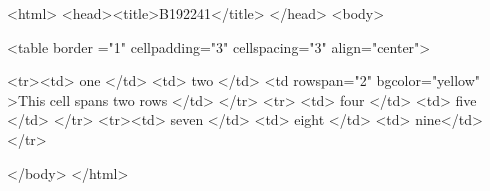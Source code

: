 <html>
<head><title>B192241</title>
</head>
<body>

<table  border ="1" cellpadding="3" cellspacing="3" align="center">

<tr><td> one </td> <td> two </td> <td rowspan="2"  bgcolor="yellow" >This cell spans two rows  </td>  </tr>
<tr> <td> four </td> <td> five </td>  </tr>
<tr><td> seven </td> <td> eight </td> <td> nine</td> </tr>
 



</body>
</html>
